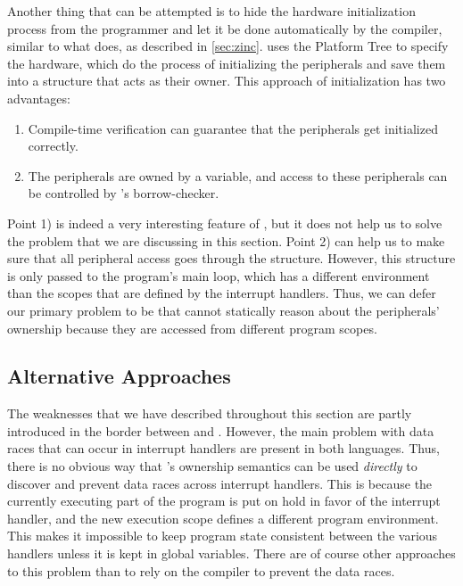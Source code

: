 Another thing that can be attempted is to hide the hardware initialization process from the programmer and let it be done automatically by the compiler, similar to what {\zinc} does, as described in \autoref{sec:zinc}.
{\zinc} uses the Platform Tree to specify the hardware, which do the process of initializing the peripherals and save them into a  structure that acts as their owner.
This approach of initialization has two advantages:

\begin{enumerate}[\hspace{13}1)]
    \item Compile-time verification can guarantee that the peripherals get initialized correctly.
    \item The peripherals are owned by a variable, and access to these peripherals can be controlled by {\rust}'s borrow-checker.
\end{enumerate}

Point 1) is indeed a very interesting feature of {\zinc}, but it does not help us to solve the problem that we are discussing in this section.
Point 2) can help us to make sure that all peripheral access goes through the  structure.
However, this structure is only passed to the program's main loop, which has a different environment than the scopes that are defined by the interrupt handlers.
Thus, we can defer our primary problem to be that {\rust} cannot statically reason about the peripherals' ownership because they are accessed from different program scopes.

\subsection{Alternative Approaches}

The weaknesses that we have described throughout this section are partly introduced in the border between {\rust} and {\C}.
However, the main problem with data races that can occur in interrupt handlers are present in both languages.
Thus, there is no obvious way that {\rust}'s ownership semantics can be used \emph{directly} to discover and prevent data races across interrupt handlers.
This is because the currently executing part of the program is put on hold in favor of the interrupt handler, and the new execution scope defines a different program environment.
This makes it impossible to keep program state consistent between the various handlers unless it is kept in global variables.
There are of course other approaches to this problem than to rely on the compiler to prevent the data races.

